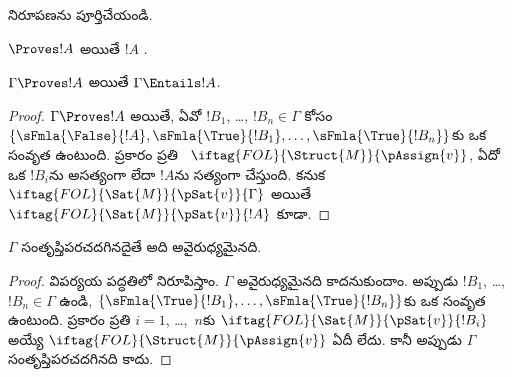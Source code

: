 \documentclass[../../../include/open-logic-section]{subfiles}
\begin{document}
\begin{prob}
 నిరూపణను పూర్తిచేయండి.
\end{prob}
\tagendprob

\begin{cor}
$\Proves !A$ అయితే $!A$ .
\end{cor}

\begin{cor}
$\Gamma \Proves !A$ అయితే $\Gamma \Entails !A$.
\end{cor}

\begin{proof}
  $\Gamma \Proves !A$ అయితే, ఏవో $!B_1$, \dots, $!B_n \in
  \Gamma$ కోసం $\{\sFmla{\False}{!A}, \sFmla{\True}{!B_1}, \dots,
  \sFmla{\True}{!B_n}\}$కు ఒక సంవృత  ఉంటుంది.
   ప్రకారం ప్రతి
  ~$\iftag{FOL}{\Struct{M}}{\pAssign{v}}$,
  ఏదో ఒక $!B_i$ను అసత్యంగా లేదా $!A$ను సత్యంగా చేస్తుంది. కనుక
  $\iftag{FOL}{\Sat{M}}{\pSat{v}}{\Gamma}$ అయితే
  $\iftag{FOL}{\Sat{M}}{\pSat{v}}{!A}$ కూడా.
\end{proof}

\begin{cor}
$\Gamma$ సంతృప్తిపరచదగినదైతే అది అవైరుధ్యమైనది.
\end{cor}

\begin{proof}
విపర్యయ పద్ధతిలో నిరూపిస్తాం. $\Gamma$ అవైరుధ్యమైనది కాదనుకుందాం.
అప్పుడు $!B_1$, \dots, $!B_n \in \Gamma$ ఉండి,
$\{\sFmla{\True}{!B_1}, \dots, \sFmla{\True}{!B_n}\}$కు ఒక సంవృత
 ఉంటుంది.  ప్రకారం ప్రతి
$i=1$, \dots,~$n$కు $\iftag{FOL}{\Sat{M}}{\pSat{v}}{!B_i}$ అయ్యే
$\iftag{FOL}{\Struct{M}}{\pAssign{v}}$ ఏదీ లేదు. కానీ అప్పుడు
$\Gamma$ సంతృప్తిపరచదగినది కాదు.
\end{proof}
\end{document}
